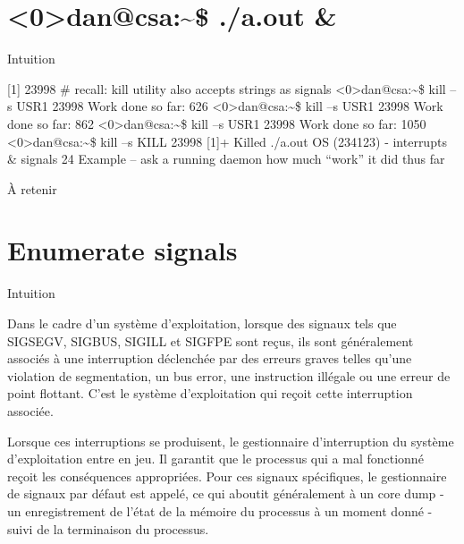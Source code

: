 \documentclass[12pt]{article}
\begin{document}
\section{<0>dan@csa:\textasciitilde{}\$ ./a.out \&}
\begin{myvulga}{Intuition}
\end{myvulga}
[1] 23998
\# recall: kill utility also accepts strings as signals
<0>dan@csa:\textasciitilde{}\$ kill –s USR1 23998
Work done so far: 626
<0>dan@csa:\textasciitilde{}\$ kill –s USR1 23998
Work done so far: 862
<0>dan@csa:\textasciitilde{}\$ kill –s USR1 23998
Work done so far: 1050
<0>dan@csa:\textasciitilde{}\$ kill –s KILL 23998
[1]+  Killed                  ./a.out
OS (234123) - interrupts \& signals
24
Example – ask a running daemon
how much “work” it did thus far
\begin{aretenir}{À retenir}
\end{aretenir}

\section{Enumerate signals}
\begin{myvulga}{Intuition}
\end{myvulga}
Dans le cadre d'un système d'exploitation, lorsque des signaux tels que SIGSEGV, SIGBUS, SIGILL et SIGFPE sont reçus, ils sont généralement associés à une interruption déclenchée par des erreurs graves telles qu'une violation de segmentation, un bus error, une instruction illégale ou une erreur de point flottant. C'est le système d'exploitation qui reçoit cette interruption associée.

Lorsque ces interruptions se produisent, le gestionnaire d'interruption du système d'exploitation entre en jeu. Il garantit que le processus qui a mal fonctionné reçoit les conséquences appropriées. Pour ces signaux spécifiques, le gestionnaire de signaux par défaut est appelé, ce qui aboutit généralement à un core dump - un enregistrement de l'état de la mémoire du processus à un moment donné - suivi de la terminaison du processus.
\end{document}
